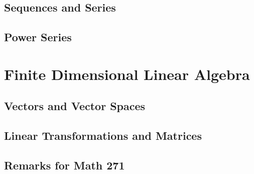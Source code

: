 \documentclass[12pt,letterpaper, openany]{book} %
\begin{document}
\chapter{Sequences and Series}


\chapter{Power Series}


\part{Finite Dimensional Linear Algebra}
\chapter{Vectors and Vector Spaces}


\chapter{Linear Transformations and Matrices}


\chapter{Remarks for Math 271}



 
\newenvironment{changemargin}[1]{%
\begin{list}{}{%
\setlength{\topsep}{#1}
\setlength{\listparindent}{\parindent}%
\setlength{\itemindent}{\parindent}%
\setlength{\parsep}{\parskip}%
}%
\item[]}{\end{list}}

\begin{changemargin}{0cm}
\printindex 
\end{changemargin}

 
\end{document}

